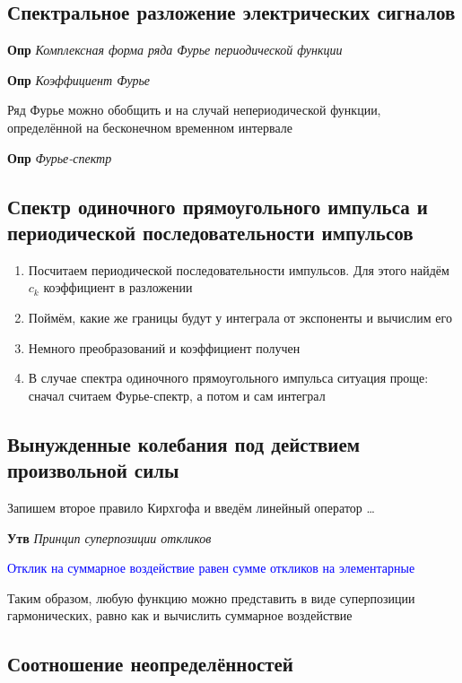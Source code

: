 \documentclass[a4paper, 14pt]{article}
\begin{document}
    \subsection{Спектральное разложение электрических сигналов}
    
    \textbf{Опр} \textit{Комплексная форма ряда Фурье периодической функции}
    
    \textbf{Опр} \textit{Коэффициент Фурье}
    
    Ряд Фурье можно обобщить и на случай непериодической функции, определённой на бесконечном временном интервале
    
    \textbf{Опр} \textit{Фурье-спектр}
    
    \subsection{Спектр одиночного прямоугольного импульса и периодической последовательности импульсов}
    
    \begin{enumerate}
        \item Посчитаем периодической последовательности импульсов.
        Для этого найдём $c_k$ коэффициент в разложении
        \item Поймём, какие же границы будут у интеграла от экспоненты и вычислим его
        \item Немного преобразований и коэффициент получен
        \item В случае спектра одиночного прямоугольного импульса ситуация проще: сначал считаем Фурье-спектр, а
        потом и сам интеграл
    \end{enumerate}
    
    \subsection{Вынужденные колебания под действием произвольной силы}
    
    Запишем второе правило Кирхгофа и введём линейный оператор \ldots
    
    \textbf{Утв} \textit{Принцип суперпозиции откликов}
    
    \textcolor{blue}{Отклик на суммарное воздействие равен сумме откликов на элементарные}
    
    Таким образом, любую функцию можно представить в виде суперпозиции гармонических, равно как и вычислить суммарное
    воздействие
    
    \subsection{Соотношение неопределённостей}
    
\end{document}
